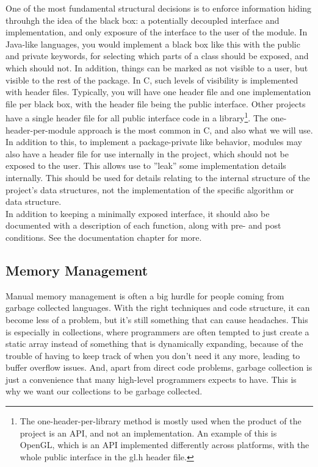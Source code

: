 \documentclass[11pt, letterpaper, twoside, openright]{book}
\begin{document}
    One of the most fundamental structural decisions is to enforce information hiding throuhgh the idea of the black box: a potentially decoupled interface and implementation, and only exposure of the interface to the user of the module. In Java-like languages, you would implement a black box like this with the public and private keywords, for selecting which parts of a class should be exposed, and which should not. In addition, things can be marked as not visible to a user, but visible to the rest of the package. In C, such levels of visibility is implemented with header files. Typically, you will have one header file and one implementation file per black box, with the header file being the public interface. Other projects have a single header file for all public interface code in a library\footnote{The one-header-per-library method is mostly used when the product of the project is an API, and not an implementation. An example of this is OpenGL, which is an API implemented differently across platforms, with the whole public interface in the gl.h header file.}. The one-header-per-module approach is the most common in C, and also what we will use. In addition to this, to implement a package-private like behavior, modules may also have a header file for use internally in the project, which should not be exposed to the user. This allows use to ''leak'' some implementation details internally. This should be used for details relating to the internal structure of the project's data structures, not the implementation of the specific algorithm or data structure.\\

    In addition to keeping a minimally exposed interface, it should also be documented with a description of each function, along with pre- and post conditions. See the documentation chapter for more.\\

  \subsection{Memory Management}
    Manual memory management is often a big hurdle for people coming from garbage collected languages. With the right techniques and code structure, it can become less of a problem, but it's still something that can cause headaches. This is especially in collections, where programmers are often tempted to just create a static array instead of something that is dynamically expanding, because of the trouble of having to keep track of when you don't need it any more, leading to buffer overflow issues. And, apart from direct code problems, garbage collection is just a convenience that many high-level programmers expects to have. This is why we want our collections to be garbage collected.\\
\end{document}
